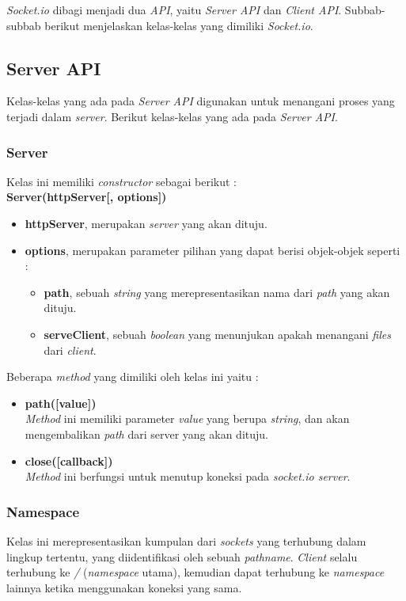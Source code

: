 \textit{Socket.io} dibagi menjadi dua \textit{API}, yaitu \textit{Server API} dan \textit{Client API}. Subbab-subbab berikut menjelaskan kelas-kelas yang dimiliki \textit{Socket.io}.

\subsection{Server API}
Kelas-kelas yang ada pada \textit{Server API} digunakan untuk menangani proses yang terjadi dalam \textit{server}. Berikut kelas-kelas yang ada pada \textit{Server API}.

\subsubsection{Server}
Kelas ini memiliki \textit{constructor} sebagai berikut : \\ \textbf{Server(httpServer[, options])}
	\begin{itemize}
		\item \textbf{httpServer}, merupakan \textit{server} yang akan dituju.
		\item \textbf{options}, merupakan parameter pilihan yang dapat berisi objek-objek seperti : 
			\begin{itemize}
				\item \textbf{path}, sebuah \textit{string} yang merepresentasikan nama dari \textit{path} yang akan dituju.
				\item \textbf{serveClient}, sebuah \textit{boolean} yang menunjukan apakah menangani \textit{files} dari \textit{client}.
			\end{itemize}
	\end{itemize}
	
Beberapa \textit{method} yang dimiliki oleh kelas ini yaitu : 

\begin{itemize}
	\item \textbf{path([value])} \\ \textit{Method} ini memiliki parameter \textit{value} yang berupa \textit{string}, dan akan mengembalikan \textit{path} dari server yang akan dituju.
	\item \textbf{close([callback])} \\ \textit{Method} ini berfungsi untuk menutup koneksi pada \textit{socket.io server}. 
\end{itemize}
	
\subsubsection{Namespace}
Kelas ini merepresentasikan kumpulan dari \textit{sockets} yang terhubung dalam lingkup tertentu, yang diidentifikasi oleh sebuah \textit{pathname}. \textit{Client} selalu terhubung ke \textit{/} (\textit{namespace} utama), kemudian dapat terhubung ke \textit{namespace} lainnya ketika menggunakan koneksi yang sama.

